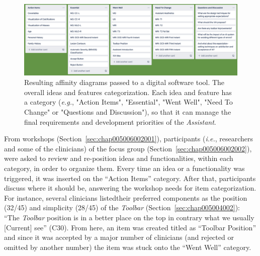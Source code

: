 
\begin{figure}[htbp]
\centering
\includegraphics[width=\columnwidth]{images/fig039}
\caption{Resulting affinity diagrams passed to a digital software tool. The overall ideas and features categorization. Each idea and feature has a category ({\it e.g.}, "Action Items", "Essential", "Went Well", "Need To Change" or "Questions and Discussion"), so that it can manage the final requirements and development priorities of the {\it Assistant}.}
\label{fig:fig039}
\end{figure}

From workshops (Section~\ref{sec:chap005006002001}), participants ({\it i.e.}, researchers and some of the clinicians) of the focus group (Section~\ref{sec:chap005006002002}), were asked to review and re-position ideas and functionalities, within each category, in order to organize them.
Every time an idea or a functionality was triggered, it was inserted on the ``Action Items'' category.
After that, participants discuss where it should be, answering the workshop needs for item categorization.
For instance, several clinicians listed\footnotemark[32] their preferred components as the position (32/45) and simplicity (28/45) of the {\it Toolbar} (Section~\ref{sec:chap005004002}):
``The {\it Toolbar} position is in a better place on the top in contrary what we usually [Current] see'' (C30).
From here, an item was created titled as ``Toolbar Position'' and since it was accepted by a major number of clinicians (and rejected or omitted by another number) the item was stuck onto the ``Went Well'' category.


